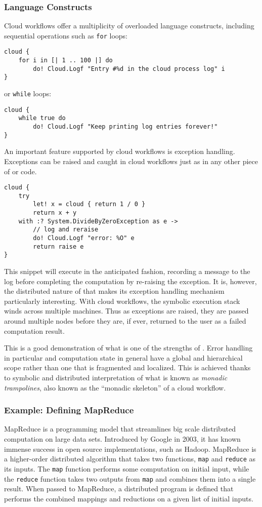 \subsubsection*{Language Constructs}
%
Cloud workflows offer a multiplicity of overloaded language constructs,
including sequential operations such as \texttt{for} loops:
\begin{lstlisting}
cloud {
    for i in [| 1 .. 100 |] do
        do! Cloud.Logf "Entry #%d in the cloud process log" i
}
\end{lstlisting}
or \texttt{while} loops:
\begin{lstlisting}
cloud {
    while true do
        do! Cloud.Logf "Keep printing log entries forever!"
}
\end{lstlisting}
%
An important feature supported by cloud workflows is exception handling. 
Exceptions can be raised and caught in cloud workflows just as in any other piece 
of \fsharp{} or \dotnet{} code. 
\begin{lstlisting}
cloud {
    try
        let! x = cloud { return 1 / 0 }
        return x + y
    with :? System.DivideByZeroException as e ->
        // log and reraise
        do! Cloud.Logf "error: %O" e
        return raise e
}
\end{lstlisting}
This snippet will execute in the anticipated fashion, recording a message to the log
before completing the computation by re-raising the exception.
It is, however, the distributed nature of \mbrace{} that makes its exception 
handling mechanism particularly interesting. With cloud workflows, the symbolic execution
stack winds across multiple machines. Thus as exceptions are raised, they are passed
around multiple nodes before they are, if ever, returned to the user as a failed
computation result.

This is a good demonstration of what is one of the strengths of \mbrace.
Error handling in particular and computation state in general have a global and hierarchical
scope rather than one that is fragmented and localized.
This is achieved thanks to symbolic and distributed interpretation of what is known as
\emph{monadic trampolines}\cite{data-types-ala-carte, scala-trampolines}, 
also known as the ``monadic skeleton'' of a cloud workflow.


\subsubsection*{Example: Defining MapReduce}

MapReduce is a programming model that streamlines big scale distributed computation
on large data sets. Introduced by Google in 2003, it has known immense success in open
source implementations, such as Hadoop. MapReduce is a higher-order distributed algorithm
that takes two functions, \texttt{map} and \texttt{reduce} as its inputs. The \texttt{map}
function performs some computation on initial input, while the \texttt{reduce} function
takes two outputs from \texttt{map} and combines them into a single result. 
When passed to MapReduce, a distributed program is defined that performs the combined 
mappings and reductions on a given list of initial inputs.

